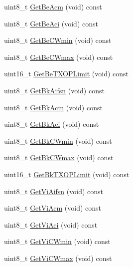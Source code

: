 \begin{DoxyCompactItemize}
\item 
uint8\+\_\+t \hyperlink{classns3_1_1EdcaParameterSet_a4e2316edd1c79f0c8e92a5689d5f3bd6}{Get\+Be\+Acm} (void) const 
\item 
uint8\+\_\+t \hyperlink{classns3_1_1EdcaParameterSet_a7653db12dd66067791bc5564c0aad1e4}{Get\+Be\+Aci} (void) const 
\item 
uint8\+\_\+t \hyperlink{classns3_1_1EdcaParameterSet_a34e542c5c37ec632800c1b32916760fc}{Get\+Be\+C\+Wmin} (void) const 
\item 
uint8\+\_\+t \hyperlink{classns3_1_1EdcaParameterSet_ae5f81b6c8f78c0ba76786065fffe6b27}{Get\+Be\+C\+Wmax} (void) const 
\item 
uint16\+\_\+t \hyperlink{classns3_1_1EdcaParameterSet_a91b9d5f17ac88b028c94376847b8bb6b}{Get\+Be\+T\+X\+O\+P\+Limit} (void) const 
\item 
uint8\+\_\+t \hyperlink{classns3_1_1EdcaParameterSet_a073af094bad2bac455414f2b8b7e2b71}{Get\+Bk\+Aifsn} (void) const 
\item 
uint8\+\_\+t \hyperlink{classns3_1_1EdcaParameterSet_a96f0dec00b21922d3b036afa86b19866}{Get\+Bk\+Acm} (void) const 
\item 
uint8\+\_\+t \hyperlink{classns3_1_1EdcaParameterSet_ab858a8af633fb9705409483623f0e941}{Get\+Bk\+Aci} (void) const 
\item 
uint8\+\_\+t \hyperlink{classns3_1_1EdcaParameterSet_a96d48dc5a317320a48b4a42a3761f061}{Get\+Bk\+C\+Wmin} (void) const 
\item 
uint8\+\_\+t \hyperlink{classns3_1_1EdcaParameterSet_a6ae8d15dc501879ff2babca524ba428f}{Get\+Bk\+C\+Wmax} (void) const 
\item 
uint16\+\_\+t \hyperlink{classns3_1_1EdcaParameterSet_a956435e70b6e0ce8d9fc76daf20cb160}{Get\+Bk\+T\+X\+O\+P\+Limit} (void) const 
\item 
uint8\+\_\+t \hyperlink{classns3_1_1EdcaParameterSet_a8933c7584ec079deebd1da1075746fb0}{Get\+Vi\+Aifsn} (void) const 
\item 
uint8\+\_\+t \hyperlink{classns3_1_1EdcaParameterSet_a64c37051eaebc10f0d38bfb06e2cbbeb}{Get\+Vi\+Acm} (void) const 
\item 
uint8\+\_\+t \hyperlink{classns3_1_1EdcaParameterSet_a7253aa2fa54fbea167dbca50c01b3bf6}{Get\+Vi\+Aci} (void) const 
\item 
uint8\+\_\+t \hyperlink{classns3_1_1EdcaParameterSet_a8122e8b9bf69c39d321e897a338d6498}{Get\+Vi\+C\+Wmin} (void) const 
\item 
uint8\+\_\+t \hyperlink{classns3_1_1EdcaParameterSet_aad852df245b725595b6ddfbb08d1262c}{Get\+Vi\+C\+Wmax} (void) const 

\end{DoxyCompactItemize}
